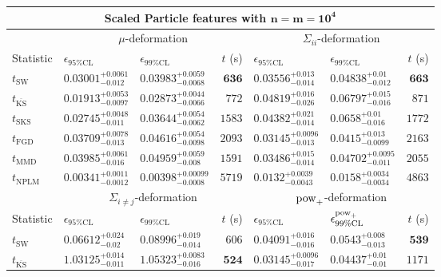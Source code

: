 \begin{tabular}{l|llr|llr}
	\toprule
	\multicolumn{7}{c}{{\bf Scaled Particle features with $\mathbf{n=m=10^{4}}$}} \\
	\toprule
	\multicolumn{1}{c}{} & \multicolumn{3}{c}{$\mu$-deformation} & \multicolumn{3}{c}{$\Sigma_{ii}$-deformation} \\
	Statistic & $\epsilon_{95\%\mathrm{CL}}$ & $\epsilon_{99\%\mathrm    {CL}}$ & $t$ (s) & $\epsilon_{95\%\mathrm{CL}}$ & $\epsilon_{99\%\mathrm{CL}}$ & $t$ (s) \\
	\midrule
	$t_{\mathrm{SW}}$ & $0.03001_{-0.012}^{+0.0061}$ & $0.03983_{-0.0068}^{+0.0059}$ & ${\mathbf{636}}$ & $0.03556_{-0.014}^{+0.013}$ & $0.04838_{-0.012}^{+0.01}$ & ${\mathbf{663}}$ \\
	$t_{\overline{\mathrm{KS}}}$ & ${\mathbf{0.01913_{-0.0097}^{+0.0053}}}$ & ${\mathbf{0.02873_{-0.0066}^{+0.0044}}}$ & $772$ & $0.04819_{-0.026}^{+0.016}$ & $0.06797_{-0.016}^{+0.015}$ & $871$ \\
	$t_{\mathrm{SKS}}$ & $0.02745_{-0.011}^{+0.0048}$ & $0.03644_{-0.0062}^{+0.0054}$ & $1583$ & $0.04382_{-0.014}^{+0.021}$ & $0.0658_{-0.016}^{+0.01}$ & $1772$ \\
	$t_{\mathrm{FGD}}$ & $0.03709_{-0.013}^{+0.0078}$ & $0.04616_{-0.0098}^{+0.0054}$ & $2093$ & ${\mathbf{0.03145_{-0.013}^{+0.0096}}}$ & ${\mathbf{0.0415_{-0.0099}^{+0.013}}}$ & $2163$ \\
	$t_{\mathrm{MMD}}$ & $0.03985_{-0.016}^{+0.0061}$ & $0.04959_{-0.008}^{+0.0059}$ & $1591$ & $0.03486_{-0.014}^{+0.015}$ & $0.04702_{-0.011}^{+0.0095}$ & $2055$ \\
\rowcolor{red!35}	$t_{\mathrm{NPLM}}$ & $0.00341_{-0.0012}^{+0.0011}$ & $0.00398_{-0.0008}^{+0.00099}$ & $5719$ & $0.0132_{-0.0043}^{+0.0039}$ & $0.0158_{-0.0034}^{+0.0034}$ & $4863$ \\
	\toprule
	\multicolumn{1}{c}{} & \multicolumn{3}{c}{$\Sigma_{i\neq j}$-deformation} & \multicolumn{3}{c}{$\rm{pow}_{+}$-deformation} \\
	Statistic & $\epsilon_{95\%\mathrm{CL}}$ & $\epsilon_{99\%\mathrm{CL}}$ & $t$ (s) & $\epsilon_{95\%\mathrm{CL}}$ & $\epsilon^{\rm   {pow}_{+}}_{99\%\mathrm{CL}}$ & $t$ (s) \\
	\midrule
	$t_{\mathrm{SW}}$ & $0.06612_{-0.02}^{+0.024}$ & $0.08996_{-0.014}^{+0.019}$ & $606$ & $0.04091_{-0.016}^{+0.016}$ & $0.0543_{-0.013}^{+0.008}$ & ${\mathbf{539}}$ \\
	$t_{\overline{\mathrm{KS}}}$ & $1.03125_{-0.011}^{+0.014}$ & $1.05323_{-0.016}^{+0.0083}$ & ${\mathbf{524}}$ & ${\mathbf{0.03145_{-0.017}^{+0.0096}}}$ & $0.04437_{-0.01}^{+0.01}$ & $1171$ \\

\end{tabular}
